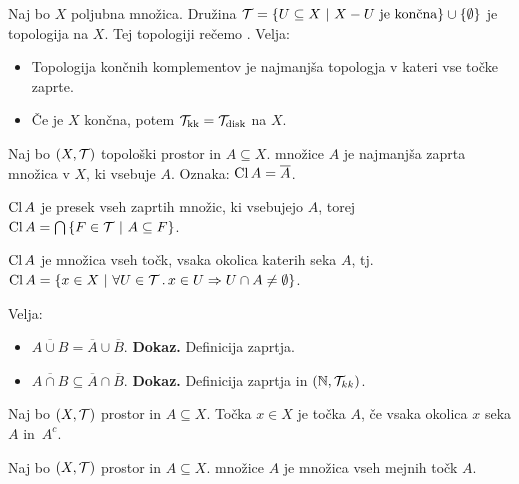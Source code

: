 \begin{primer}
    Naj bo $X$ poljubna množica. Družina $\mathcal{T} = \left\{U \subseteq X \ | \ X - U \text{ je končna}\right\} \cup \left\{\emptyset\right\}$ je topologija na $X$. Tej topologiji rečemo . Velja:

    \begin{itemize}
        \item Topologija končnih komplementov je najmanjša topologja v kateri vse točke zaprte. 
        \item Če je $X$ končna, potem $\mathcal{T}_{\text{kk}}=\mathcal{T}_{\text{disk}}$ na $X$.
    \end{itemize}    
\end{primer}

\begin{definicija}
    Naj bo $(X, \mathcal{T})$ topološki prostor in $A \subseteq X$.  množice $A$ je najmanjša zaprta množica v $X$, ki vsebuje $A$. Oznaka: $\operatorname{Cl} A = \overline{A}$.
\end{definicija}

\begin{trditev}
    $\operatorname{Cl} A$ je presek vseh zaprtih množic, ki vsebujejo $A$, torej $\operatorname{Cl} A = \bigcap \left\{F \in \mathcal{T} \ | \ A \subseteq F\right\}$.
\end{trditev}

\begin{trditev}
    $\operatorname{Cl} A$ je množica vseh točk, vsaka okolica katerih seka $A$, tj. $\operatorname{Cl} A = \left\{x \in X \ | \ \forall U \in \mathcal{T} \,.\, x \in U \Rightarrow U \cap A \neq \emptyset\right\}$.
\end{trditev}

\begin{primer}
    Velja:
    \begin{itemize}
        \item $\overline{A \cup B} = \overline{A} \cup \overline{B}$. \textbf{Dokaz.} Definicija zaprtja.
        \item $\overline{A \cap B} \subseteq \overline{A} \cap \overline{B}$. \textbf{Dokaz.} Definicija zaprtja in $(\mathbb{N}, \mathcal{T}_{kk})$.
    \end{itemize}
\end{primer}

\begin{definicija}
    Naj bo $(X, \mathcal{T})$ prostor in $A \subseteq X$. Točka $x \in X$ je  točka $A$, če vsaka okolica $x$ seka $A$ in~$A^c$.
\end{definicija}

\begin{definicija}
    Naj bo $(X, \mathcal{T})$ prostor in $A \subseteq X$.  množice $A$ je množica vseh mejnih točk $A$.
\end{definicija}

